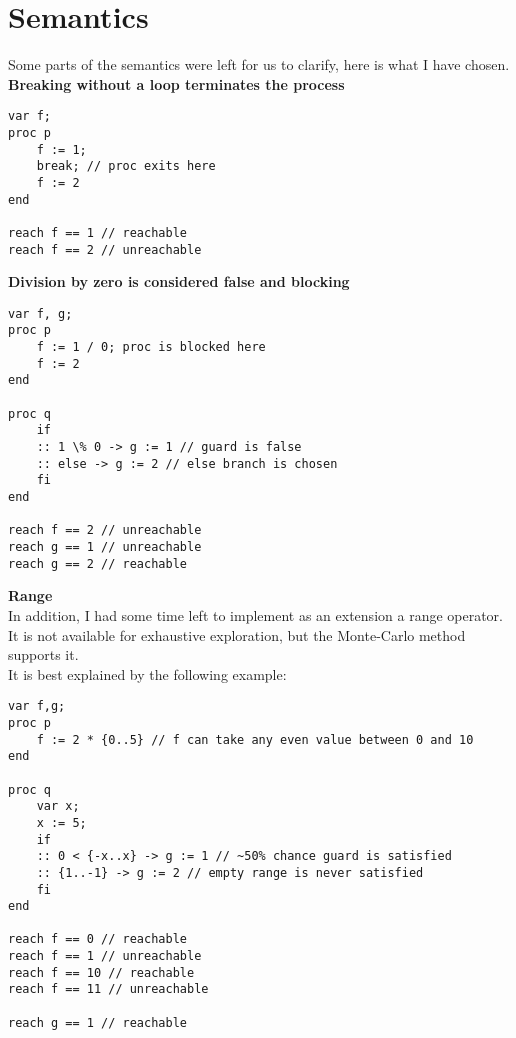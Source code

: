 \section{Semantics}

Some parts of the semantics were left for us to clarify, here is what I have chosen.\\

\textbf{Breaking without a loop terminates the process}
\begin{lstlisting}
var f;
proc p
    f := 1;
    break; // proc exits here
    f := 2
end

reach f == 1 // reachable
reach f == 2 // unreachable
\end{lstlisting}


\textbf{Division by zero is considered false and blocking}
\begin{lstlisting}
var f, g;
proc p
    f := 1 / 0; proc is blocked here
    f := 2
end

proc q
    if
    :: 1 \% 0 -> g := 1 // guard is false
    :: else -> g := 2 // else branch is chosen
    fi
end

reach f == 2 // unreachable
reach g == 1 // unreachable
reach g == 2 // reachable
\end{lstlisting}

\textbf{Range}\\
In addition, I had some time left to implement as an extension
a range operator. It is not available for exhaustive exploration,
but the Monte-Carlo method supports it.\\
It is best explained by the following example:
\begin{lstlisting}
var f,g;
proc p
    f := 2 * {0..5} // f can take any even value between 0 and 10
end

proc q
    var x;
    x := 5;
    if
    :: 0 < {-x..x} -> g := 1 // ~50% chance guard is satisfied
    :: {1..-1} -> g := 2 // empty range is never satisfied
    fi
end

reach f == 0 // reachable
reach f == 1 // unreachable
reach f == 10 // reachable
reach f == 11 // unreachable

reach g == 1 // reachable
\end{lstlisting}


